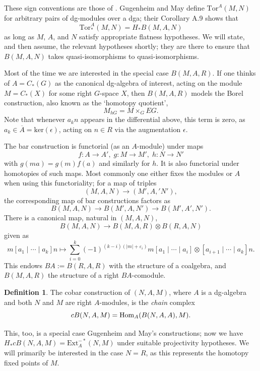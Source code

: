 \documentclass{memo-l}
\theoremstyle{definition}
\newtheorem{definition}[theorem]{Definition}
\theoremstyle{remark}
\numberwithin{section}{chapter}
\numberwithin{equation}{chapter}
\begin{document}
\noindent These sign conventions are those of \cite{GM}. Gugenheim and May define $\text{Tor}^A(M,N)$ for arbitrary pairs of dg-modules over a dga; their Corollary A.9 shows that $$\text{Tor}^A_*(M,N) = H_*B(M,A,N)$$ as long as $M$, $A$, and $N$ satisfy appropriate flatness hypotheses. We will state, and then assume, the relevant hypotheses shortly; they are there to ensure that $B(M,A,N)$ takes quasi-isomorphisms to quasi-isomorphisms.

Most of the time we are interested in the special case $B(M,A,R)$. If one thinks of $A = C_*(G)$ as the canonical dg-algebra of interest, acting on the module $M = C_*(X)$ for some right $G$-space $X$, then $B(M,A,R)$ models the Borel construction, also known as the `homotopy quotient', $$M_{hG} = M \times_G EG.$$ Note that whenever $a_k n$ appears in the differential above, this term is zero, as $a_k \in \overline A = \text{ker}(\epsilon)$, acting on $n \in R$ via the augmentation $\epsilon$.

The bar construction is functorial (as an $A$-module) under maps 
$$f: A \to A', \;g: M \to M', \; h: N \to N'$$ 
with $g(ma) = g(m)f(a)$ and similarly for $h$. It is also functorial under homotopies of such maps. Most commonly one either fixes the modules or $A$ when using this functoriality; for a map of triples 
$$(M,A,N) \to (M',A,'N'),$$ 
the corresponding map of bar constructions factors as 
$$B(M,A,N) \to B(M',A,N') \to B(M',A',N').$$
There is a canonical map, natural in $(M,A,N)$, 
\begin{equation}\label{comodule}B(M, A, N) \to B(M,A,R) \otimes B(R,A,N)\end{equation} 
given as 
$$m [a_1 \mid \cdots \mid a_k] n \mapsto \sum_{i=0}^k (-1)^{(k-i)(|m|+\varepsilon_i)}m[a_1 \mid \cdots \mid a_i] \otimes [a_{i+1}\mid \cdots \mid a_k] n.$$ 
This endows $BA := B(R,A,R)$ with the structure of a coalgebra, and $B(M,A,R)$ the structure of a right $BA$-comodule. 

\begin{definition}The cobar construction of $(N,A,M)$, where $A$ is a dg-algebra and both $N$ and $M$ are right $A$-modules, is the \emph{chain} complex $$cB(N,A,M) = \textup{Hom}_A(B(N,A,A),M).$$
\end{definition} 

This, too, is a special case Gugenheim and May's constructions; now we have $H_* cB(N,A,M) = \text{Ext}_A^{-*}(N,M)$ under suitable projectivity hypotheses. We will primarily be interested in the case $N = R$, as this represents the homotopy fixed points of $M$.
\end{document}

